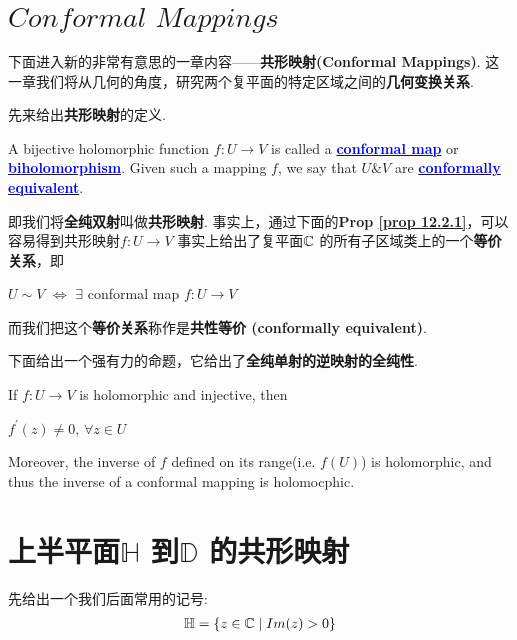 \newpage
\section{$Conformal \,\, Mappings$}
	下面进入新的非常有意思的一章内容——\textbf{共形映射(Conformal Mappings)}. 这一章我们将从几何的角度，研究两个复平面的特定区域之间的\textbf{几何变换关系}.
	
	\vspace*{1em}
	先来给出\textbf{共形映射}的定义.
	\begin{defn}\label{def 12.2.1}
		A bijective holomorphic function $f : U \rightarrow V$ is called a \underline{\textcolor{blue}{\textbf{conformal map}}} or \underline{\textcolor{blue}{\textbf{biholomorphism}}}. Given such a mapping $f$, we say that $U \& V$ are \underline{\textcolor{blue}{\textbf{conformally equivalent}}}.
		
		\vspace*{2em}
		\begin{rmk}
			即我们将\textbf{全纯双射}叫做\textbf{共形映射}. 事实上，通过下面的\textbf{Prop \ref{prop 12.2.1}}，可以容易得到共形映射$f : U \rightarrow V$ 事实上给出了复平面$\mathbb{C}$ 的所有子区域类上的一个\textbf{等价关系}，即
			\begin{center}
				$U \sim V \,\, \Leftrightarrow \,\, \exists$ conformal map $f : U \rightarrow V$
			\end{center}
			而我们把这个\textbf{等价关系}称作是\textbf{共性等价 (conformally equivalent)}.
		\end{rmk}
	\end{defn}
	
	\vspace*{8em}
	下面给出一个强有力的命题，它给出了\textbf{全纯单射的逆映射的全纯性}.
	\begin{proposition}\label{prop 12.2.1}
		If $f : U \rightarrow V$ is holomorphic and injective, then
		\begin{center}
			$f^{'}(z) \neq 0$, $\forall z \in U$
		\end{center}
		Moreover, the inverse of $f$ defined on its range(i.e. $f(U)$) is holomorphic, and thus the inverse of a conformal mapping is holomocphic.
	\end{proposition}

\newpage
\section{上半平面$\mathbb{H}$ 到$\mathbb{D}$ 的共形映射}
	先给出一个我们后面常用的记号:
	\begin{align}
		\mathbb{H} = \{ z \in \mathbb{C} \mid Im(z) > 0 \}
	\end{align}
	
